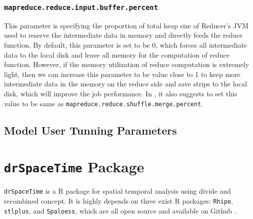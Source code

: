 \subsubsection{\texttt{mapreduce.reduce.input.buffer.percent}}

This parameter is specifying the proportion of total heap size of Reducer's JVM
used to reserve the intermediate data in memory and directly feeds the reduce
function. By default, this parameter is set to be 0, which forces all intermediate
data to the local disk and leave all memory for the computation of reduce function.
However, if the memory utilization of reduce computation is extremely light, then
we can increase this parameter to be value close to 1 to keep more intermediate
data in the memory on the reduce side and save strips to the local disk, which
will improve the job performance. In \cite{li2014mronline}, it also suggests to
set this value to be same as \texttt{mapreduce.reduce.shuffle.merge.percent}. 

\subsection{Model User Tunning Parameters}


\section{\texttt{drSpaceTime} Package}

\texttt{drSpaceTime} is a R package for spatial temporal analysis using divide 
and recombined concept. It is highly depends on three exist R packages: 
\texttt{Rhipe}, \texttt{stlplus}, and \texttt{Spaloess}, which are all open 
source and available on Github \cite{github}.